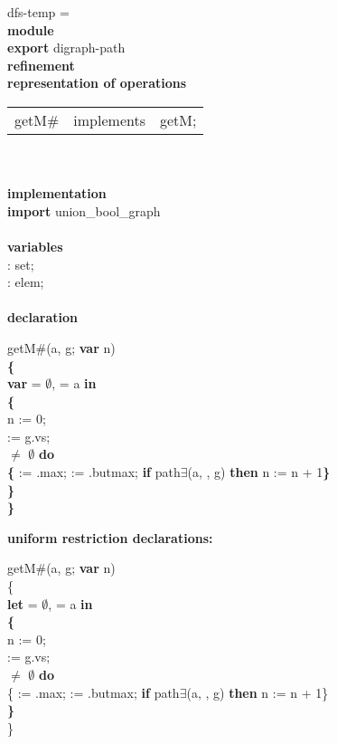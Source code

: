 \begin{tabbing}
dfs-temp = \\
{\bf mod}\={\bf ule}\+\\
{\bf export} digraph-path\\
{\bf ref}\={\bf inement}\+\\
{\bf rep}\= {\bf resentation of operations}\+\\
\begin{tabular}{lcl}
getM\# & implements & getM;
\end{tabular}\-\\

\\
{\bf implementation}\\
{\bf import} union\_bool\_graph\\
\\
{\bf vari}\={\bf ables}\+\\
: set;\\
: elem;
\-\\
\\

               {\bf declaration}
\end{tabbing}

{\parindent1cm 
getM\#(a, g; {\bf var} n) \\
{\bf \{}\\
{\bf var}  = $\emptyset$,  = a {\bf in}\\
{\bf \{}\\
\tabbe n := 0;\\
\tabbe {} := g.vs;\\
  $\neq$ $\emptyset$ {\bf do}\\
\tabbe {} {\bf \{}  := .max;  := .butmax; {\bf if} path$\exists$(a, , g) {\bf then} n := n + 1{\bf \}}\\
{\bf \}}\\
{\bf \}}
}



\bigskip

{\bf uniform restriction declarations:}

getM\#(a, g; {\bf var} n) \\
\{\\
{\bf let}  = $\emptyset$,  = a {\bf in}\\
{\bf \{}\\
\tabbe n := 0;\\
\tabbe {} := g.vs;\\
  $\neq$ $\emptyset$ {\bf do}\\
\tabbe {} \{ := .max;  := .butmax; {\bf if} path$\exists$(a, , g) {\bf then} n := n + 1\}\\
{\bf \}}\\
\}

\bigskip



\par\mbox{}\hrulefill\mbox{}\par